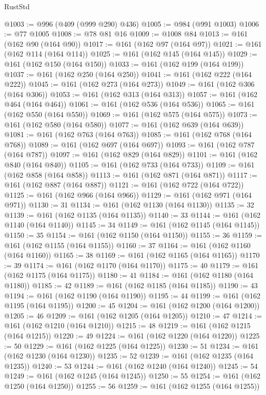 \begin{lexlean}{RustStd}
\begin{coremodule}
@1003 := @996 (@409 (@999 @290) @436)
@1005 := @984 (@991 @1003)
@1006 := @77 @1005
@1008 := @78 @81 @16
@1009 := @1008 @84
@1013 := @161 (@162 @90 (@164 @90))
@1017 := @161 (@162 @97 (@164 @97))
@1021 := @161 (@162 @114 (@164 @114))
@1025 := @161 (@162 @145 (@164 @145))
@1029 := @161 (@162 @150 (@164 @150))
@1033 := @161 (@162 @199 (@164 @199))
@1037 := @161 (@162 @250 (@164 @250))
@1041 := @161 (@162 @222 (@164 @222))
@1045 := @161 (@162 @273 (@164 @273))
@1049 := @161 (@162 @306 (@164 @306))
@1053 := @161 (@162 @313 (@164 @313))
@1057 := @161 (@162 @464 (@164 @464))
@1061 := @161 (@162 @536 (@164 @536))
@1065 := @161 (@162 @550 (@164 @550))
@1069 := @161 (@162 @575 (@164 @575))
@1073 := @161 (@162 @580 (@164 @580))
@1077 := @161 (@162 @639 (@164 @639))
@1081 := @161 (@162 @763 (@164 @763))
@1085 := @161 (@162 @768 (@164 @768))
@1089 := @161 (@162 @697 (@164 @697))
@1093 := @161 (@162 @787 (@164 @787))
@1097 := @161 (@162 @829 (@164 @829))
@1101 := @161 (@162 @840 (@164 @840))
@1105 := @161 (@162 @733 (@164 @733))
@1109 := @161 (@162 @858 (@164 @858))
@1113 := @161 (@162 @871 (@164 @871))
@1117 := @161 (@162 @887 (@164 @887))
@1121 := @161 (@162 @722 (@164 @722))
@1125 := @161 (@162 @966 (@164 @966))
@1129 := @161 (@162 @971 (@164 @971))
@1130 := 31
@1134 := @161 (@162 @1130 (@164 @1130))
@1135 := 32
@1139 := @161 (@162 @1135 (@164 @1135))
@1140 := 33
@1144 := @161 (@162 @1140 (@164 @1140))
@1145 := 34
@1149 := @161 (@162 @1145 (@164 @1145))
@1150 := 35
@1154 := @161 (@162 @1150 (@164 @1150))
@1155 := 36
@1159 := @161 (@162 @1155 (@164 @1155))
@1160 := 37
@1164 := @161 (@162 @1160 (@164 @1160))
@1165 := 38
@1169 := @161 (@162 @1165 (@164 @1165))
@1170 := 39
@1174 := @161 (@162 @1170 (@164 @1170))
@1175 := 40
@1179 := @161 (@162 @1175 (@164 @1175))
@1180 := 41
@1184 := @161 (@162 @1180 (@164 @1180))
@1185 := 42
@1189 := @161 (@162 @1185 (@164 @1185))
@1190 := 43
@1194 := @161 (@162 @1190 (@164 @1190))
@1195 := 44
@1199 := @161 (@162 @1195 (@164 @1195))
@1200 := 45
@1204 := @161 (@162 @1200 (@164 @1200))
@1205 := 46
@1209 := @161 (@162 @1205 (@164 @1205))
@1210 := 47
@1214 := @161 (@162 @1210 (@164 @1210))
@1215 := 48
@1219 := @161 (@162 @1215 (@164 @1215))
@1220 := 49
@1224 := @161 (@162 @1220 (@164 @1220))
@1225 := 50
@1229 := @161 (@162 @1225 (@164 @1225))
@1230 := 51
@1234 := @161 (@162 @1230 (@164 @1230))
@1235 := 52
@1239 := @161 (@162 @1235 (@164 @1235))
@1240 := 53
@1244 := @161 (@162 @1240 (@164 @1240))
@1245 := 54
@1249 := @161 (@162 @1245 (@164 @1245))
@1250 := 55
@1254 := @161 (@162 @1250 (@164 @1250))
@1255 := 56
@1259 := @161 (@162 @1255 (@164 @1255))

\end{coremodule}
\end{lexlean}
